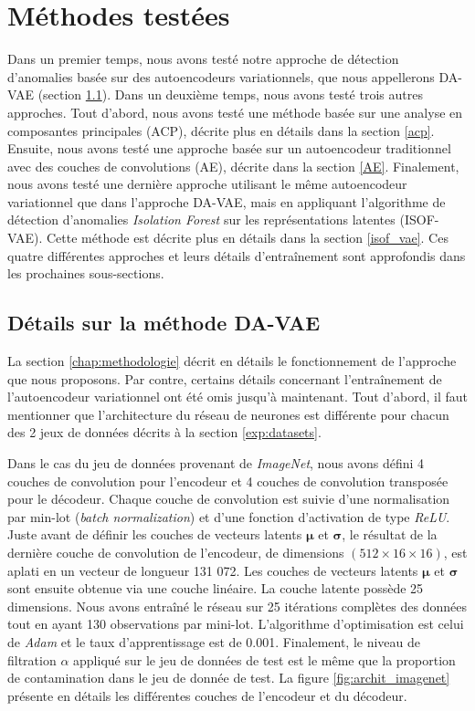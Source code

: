 \section{Méthodes testées}

Dans un premier temps, nous avons testé notre approche de détection d'anomalies basée sur des autoencodeurs variationnels, que nous appellerons DA-VAE (section \ref{DA_VAE}). Dans un deuxième temps, nous avons testé trois autres approches. Tout d'abord, nous avons testé une méthode basée sur une analyse en composantes principales (ACP), décrite plus en détails dans la section \ref{acp}. Ensuite, nous avons testé une approche basée sur un autoencodeur traditionnel avec des couches de convolutions (AE), décrite dans la section \ref{AE}. Finalement, nous avons testé une dernière approche utilisant le même autoencodeur variationnel que dans l'approche DA-VAE, mais en appliquant l'algorithme de détection d'anomalies \textit{Isolation Forest} \citep{4781136} sur les représentations latentes (ISOF-VAE). Cette méthode est décrite plus en détails dans la section \ref{isof_vae}. Ces quatre différentes approches et leurs détails d'entraînement sont approfondis dans les prochaines sous-sections.

\subsection{Détails sur la méthode DA-VAE} \label{DA_VAE}

La section \ref{chap:methodologie} décrit en détails le fonctionnement de l'approche que nous proposons. Par contre, certains détails concernant l'entraînement de l'autoencodeur variationnel ont été omis jusqu'à maintenant. Tout d'abord, il faut mentionner que l'architecture du réseau de neurones est différente pour chacun des 2 jeux de données décrits à la section \ref{exp:datasets}.

Dans le cas du jeu de données provenant de \textit{ImageNet}, nous avons défini 4 couches de convolution pour l'encodeur et 4 couches de convolution transposée pour le décodeur. Chaque couche de convolution est suivie d'une normalisation par min-lot (\textit{batch normalization}) et d'une fonction d'activation de type \textit{ReLU}. Juste avant de définir les couches de vecteurs latents $\boldsymbol{\mu}$ et $\boldsymbol{\sigma}$, le résultat de la dernière couche de convolution de l'encodeur, de dimensions $(512 \times 16 \times 16)$, est aplati en un vecteur de longueur 131 072. Les couches de vecteurs latents $\boldsymbol{\mu}$ et $\boldsymbol{\sigma}$ sont ensuite obtenue via une couche linéaire. La couche latente possède 25 dimensions. Nous avons entraîné le réseau sur 25 itérations complètes des données tout en ayant 130 observations par mini-lot. L'algorithme d'optimisation est celui de \textit{Adam} \citep{kingma2014method} et le taux d'apprentissage est de 0.001. Finalement, le niveau de filtration $\alpha$ appliqué sur le jeu de données de test est le même que la proportion de contamination dans le jeu de donnée de test. La figure \ref{fig:archit_imagenet} présente en détails les différentes couches de l'encodeur et du décodeur.

